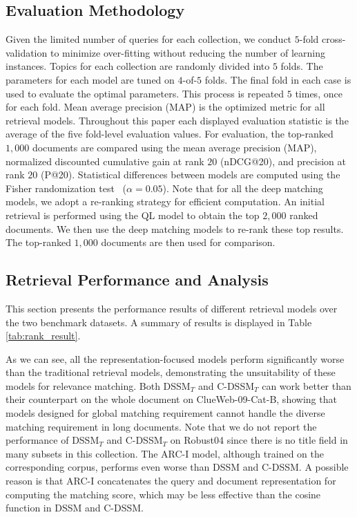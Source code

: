 \documentclass{sig-alternate-05-2015}
\begin{document}
\subsection{Evaluation Methodology}
Given the limited number of queries for each collection, we conduct $5$-fold cross-validation to minimize over-fitting without reducing the number of learning instances. Topics for each collection are randomly divided into $5$ folds. The parameters for each model are tuned on $4$-of-$5$ folds. The final fold in each case is used to evaluate the optimal parameters. This process is repeated $5$ times, once for each fold. Mean average precision (MAP) is the optimized metric for all retrieval models. Throughout this paper each displayed evaluation statistic is the average of the five fold-level evaluation values. For evaluation, the top-ranked $1,000$ documents are compared using the mean average precision (MAP), normalized discounted cumulative gain at rank $20$ (nDCG@20), and precision at rank $20$ (P@20). Statistical differences between models are computed using the Fisher randomization test~\cite{smucker2007comparison} ($\alpha=0.05$). Note that for all the deep matching models, we adopt a re-ranking strategy for efficient computation. An initial retrieval is performed using the QL model to obtain the top $2,000$ ranked documents. We then use the deep matching models to re-rank these top results. The top-ranked $1,000$ documents are then used for comparison.


\subsection{Retrieval Performance and Analysis}
This section presents the performance results of \mbox{different} retrieval models over the two benchmark datasets. A summary of results is displayed in Table \ref{tab:rank_result}.

As we can see, all the representation-focused models perform significantly worse than the traditional retrieval models, demonstrating the unsuitability of these models for relevance matching. Both DSSM$_T$ and C-DSSM$_T$ can work better than their counterpart on the whole document on ClueWeb-09-Cat-B, showing that models designed for global matching requirement cannot handle the diverse matching requirement in long documents. Note that we do not report the performance of DSSM$_T$ and C-DSSM$_T$ on Robust04 since there is no title field in many subsets in this collection. The ARC-I model, although trained on the corresponding corpus, performs even worse than DSSM and C-DSSM. A possible reason is that ARC-I concatenates the query and document representation for computing the matching score, which may be less effective than the cosine function in DSSM and C-DSSM.
\end{document}
